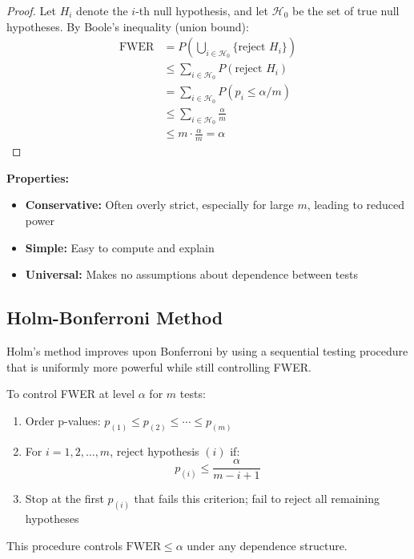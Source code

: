 \begin{proof}
Let $H_i$ denote the $i$-th null hypothesis, and let $\mathcal{H}_0$ be the set of true null hypotheses. By Boole's inequality (union bound):
\begin{align}
\text{FWER} &= P\left(\bigcup_{i \in \mathcal{H}_0} \{\text{reject } H_i\}\right) \\
&\leq \sum_{i \in \mathcal{H}_0} P(\text{reject } H_i) \\
&= \sum_{i \in \mathcal{H}_0} P(p_i \leq \alpha/m) \\
&\leq \sum_{i \in \mathcal{H}_0} \frac{\alpha}{m} \\
&\leq m \cdot \frac{\alpha}{m} = \alpha
\end{align}
\end{proof}

\textbf{Properties:}
\begin{itemize}
    \item \textbf{Conservative:} Often overly strict, especially for large $m$, leading to reduced power
    \item \textbf{Simple:} Easy to compute and explain
    \item \textbf{Universal:} Makes no assumptions about dependence between tests
\end{itemize}

\subsection{Holm-Bonferroni Method}

Holm's method improves upon Bonferroni by using a sequential testing procedure that is uniformly more powerful while still controlling FWER.

\begin{theorem}
To control FWER at level $\alpha$ for $m$ tests:
\begin{enumerate}
    \item Order p-values: $p_{(1)} \leq p_{(2)} \leq \cdots \leq p_{(m)}$
    \item For $i = 1, 2, \ldots, m$, reject hypothesis $(i)$ if:
    \begin{equation}
    p_{(i)} \leq \frac{\alpha}{m - i + 1}
    \end{equation}
    \item Stop at the first $p_{(i)}$ that fails this criterion; fail to reject all remaining hypotheses
\end{enumerate}

This procedure controls $\text{FWER} \leq \alpha$ under any dependence structure.
\end{theorem}

